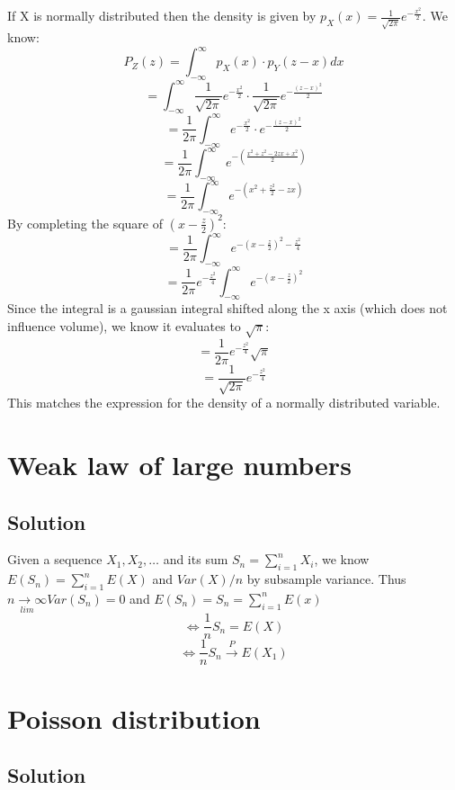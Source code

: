 \documentclass[10pt]{article}
\numberwithin{equation}{section}
\begin{document}
\begin{enumerate}
{\item[c]{
    If X is normally distributed then the density is given by $p_X(x) = \frac{1}{\sqrt{2\pi}} e^{-\frac{x^2}{2}}$. We know:
    $$P_Z(z) = \int_{-\infty}^{\infty} p_X(x) \cdot p_Y(z-x)dx$$
    $$= \int_{-\infty}^{\infty} \frac{1}{\sqrt{2\pi}} e^{-\frac{x^2}{2}} \cdot \frac{1}{\sqrt{2\pi}} e^{-\frac{(z-x)^2}{2}}$$
    $$= \frac{1}{2\pi}\int_{-\infty}^{\infty}  e^{-\frac{x^2}{2}} \cdot e^{-\frac{(z-x)^2}{2}}$$
    $$= \frac{1}{2\pi}\int_{-\infty}^{\infty}  e^{- \left(\frac{x^2 +z^2 -2zx + x^2}{2}\right)}$$
  $$= \frac{1}{2\pi}\int_{-\infty}^{\infty}  e^{- \left(x^2 +\frac{z^2}{2} -zx\right)}$$
  By completing the square of $(x-\frac{z}{2})^2$:
  $$= \frac{1}{2\pi}\int_{-\infty}^{\infty}  e^{-(x-\frac{z}{2})^2 - \frac{z^2}{4}}$$
  $$= \frac{1}{2\pi} e^{-\frac{z^2}{4}} \int_{-\infty}^{\infty}  e^{-(x-\frac{z}{2})^2} $$
  Since the integral is a gaussian integral shifted along the x axis (which does not influence volume), we know it evaluates to $\sqrt{\pi}$:
  $$= \frac{1}{2\pi} e^{-\frac{z^2}{4}} \sqrt{\pi}$$
  $$= \frac{1}{\sqrt{2\pi}} e^{-\frac{z^2}{4}}$$
  This matches the expression for the density of a normally distributed variable.
  }


    }
\end{enumerate}

\section*{Weak law of large numbers}

\subsection*{Solution}
Given a sequence $X_1, X_2, \dots$ and its sum $S_n = \sum_{i=1}^n X_i$, we know $E(S_n) = \sum_{i=1}^{n} E(X)$ and $Var(X)/n$ by subsample variance.
Thus $\underset{lim}{n\rightarrow \infty} Var(S_n) = 0$ and $E(S_n) = S_n = \sum_{i=1}^n E(x)$ 
$$\Leftrightarrow \frac{1}{n} S_n = E(X)$$ 
$$\Leftrightarrow \frac{1}{n} S_n \overset{P}{\rightarrow}E(X_1)$$ 

\section*{Poisson distribution}
\subsection*{Solution}
\end{document}
